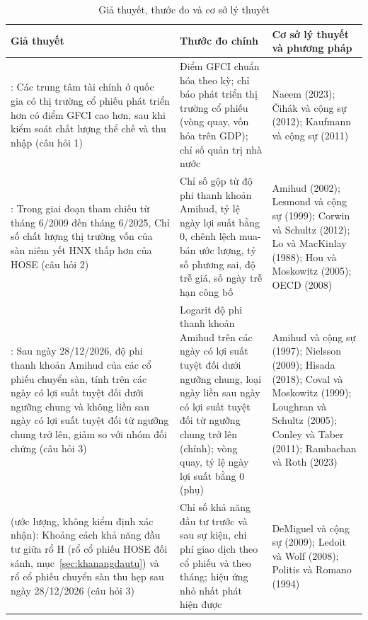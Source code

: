\begin{table}[H]
\myfloatalign
\caption{Giả thuyết, thước đo và cơ sở lý thuyết}\label{tab:giathuyet}
{\bangnho
\begin{tabularx}{\textwidth}{@{}>{\raggedright\arraybackslash}p{} L >{\raggedright\arraybackslash}p{0.27\textwidth}@{}}
\toprule
Giả thuyết & Thước đo chính & Cơ sở lý thuyết và phương pháp\\
\midrule
{}: Các trung tâm tài chính ở quốc gia có thị trường cổ phiếu phát triển hơn có điểm GFCI cao hơn, sau khi kiểm soát chất lượng thể chế và thu nhập (câu hỏi 1) & Điểm GFCI chuẩn hóa theo kỳ; chỉ báo phát triển thị trường cổ phiếu (vòng quay, vốn hóa trên GDP); chỉ số quản trị nhà nước & Naeem (2023); Čihák và cộng sự (2012); Kaufmann và cộng sự (2011)\\
\addlinespace
{}: Trong giai đoạn tham chiếu từ tháng 6/2009 đến tháng 6/2025, Chỉ số chất lượng thị trường vốn của sàn niêm yết HNX thấp hơn của HOSE (câu hỏi 2) & Chỉ số gộp từ độ phi thanh khoản Amihud, tỷ lệ ngày lợi suất bằng 0, chênh lệch mua-bán ước lượng, tỷ số phương sai, độ trễ giá, số ngày trễ hạn công bố & Amihud (2002); Lesmond và cộng sự (1999); Corwin và Schultz (2012); Lo và MacKinlay (1988); Hou và Moskowitz (2005); OECD (2008)\\
\addlinespace
{}: Sau ngày 28/12/2026, độ phi thanh khoản Amihud của các cổ phiếu chuyển sàn, tính trên các ngày có lợi suất tuyệt đối dưới ngưỡng chung và không liền sau ngày có lợi suất tuyệt đối từ ngưỡng chung trở lên, giảm so với nhóm đối chứng (câu hỏi 3) & Logarit độ phi thanh khoản Amihud trên các ngày có lợi suất tuyệt đối dưới ngưỡng chung, loại ngày liền sau ngày có lợi suất tuyệt đối từ ngưỡng chung trở lên (chính); vòng quay, tỷ lệ ngày lợi suất bằng 0 (phụ) & Amihud và cộng sự (1997); Nielsson (2009); Hisada (2018); Coval và Moskowitz (1999); Loughran và Schultz (2005); Conley và Taber (2011); Rambachan và Roth (2023)\\
\addlinespace
{} (ước lượng, không kiểm định xác nhận): Khoảng cách khả năng đầu tư giữa rổ H (rổ cổ phiếu HOSE đối sánh, mục~\ref{sec:khanangdautu}) và rổ cổ phiếu chuyển sàn thu hẹp sau ngày 28/12/2026 (câu hỏi 3) & Chỉ số khả năng đầu tư trước và sau sự kiện, chi phí giao dịch theo cổ phiếu và theo tháng; hiệu ứng nhỏ nhất phát hiện được & DeMiguel và cộng sự (2009); Ledoit và Wolf (2008); Politis và Romano (1994)\\
\bottomrule
\end{tabularx}}
\end{table}

